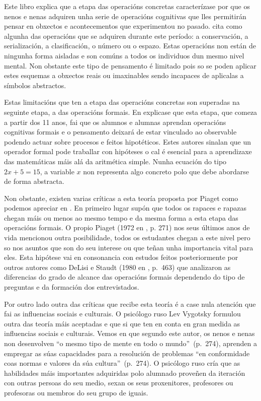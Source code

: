 Este libro explica que a etapa das operacións concretas caracterízase por que os nenos e nenas adquiren unha serie de operacións cognitivas que lles permitirán pensar en obxectos e acontecementos que experimentou no pasado.  cita como algunha das operacións que se adquiren durante este período: a conservación, a serialización, a clasificación, o número ou o espazo. Estas operacións non están de ningunha forma aisladas e son comúns a todos os individuos dun mesmo nivel mental. Non obstante este tipo de pensamento é limitado pois so se poden aplicar estes esquemas a obxectos reais ou imaxinables sendo incapaces de aplicalas a símbolos abstractos.

Estas limitacións que ten a etapa das operacións concretas son superadas na seguinte etapa, a das operacións formais. En  explicase que esta etapa, que comeza a partir dos 11 anos, fai que os alumnos e alumnas aprendan operacións cognitivas formais e o pensamento deixará de estar vinculado ao observable podendo actuar sobre procesos e feitos hipotéticos. Estes autores sinalan que un operador formal pode traballar con hipóteses o cal é esencial para a aprendizaxe das matemáticas máis alá da aritmética simple. Nunha ecuación do tipo $2x + 5 = 15$, a variable $x$ non representa algo concreto polo que debe abordarse de forma abstracta.

Non obstante, existen varias críticas a esta teoría proposta por Piaget como podemos apreciar en . En primeiro lugar supón que todos os rapaces e rapazas chegan máis ou menos ao mesmo tempo e da mesma forma a esta etapa das operacións formais. O propio Piaget (1972 en , p. 271) nos seus últimos anos de vida mencionou outra posibilidade, todos os estudantes chegan a este nivel pero so nos asuntos que son do seu interese ou que teñan unha importancia vital para eles. Esta hipótese vai en consonancia con estudos feitos posteriormente por outros autores como DeLisi e Staudt (1980 en , p.~463) que analizaron as diferencias do grado de alcance das operacións formais dependendo do tipo de preguntas e da formación dos entrevistados.

Por outro lado outra das críticas que recibe esta teoría é a case nula atención que fai as influencias sociais e culturais. O psicólogo ruso Lev Vygotsky formulou outra das teoría máis aceptadas e que si que ten en conta en gran medida as influencias sociais e culturais. Vemos en  que segundo este autor, os nenos e nenas non desenvolven ``o mesmo tipo de mente en todo o mundo''~(p.~274), aprenden a empregar as súas capacidades para a resolución de problemas ``en conformidade coas normas e valores da súa cultura''~(p.~274). O psicólogo ruso cría que as habilidades máis importantes adquiridas polo alumnado proveñen da iteración con outras persoas do seu medio, sexan os seus proxenitores, profesores ou profesoras ou membros do seu grupo de iguais.


